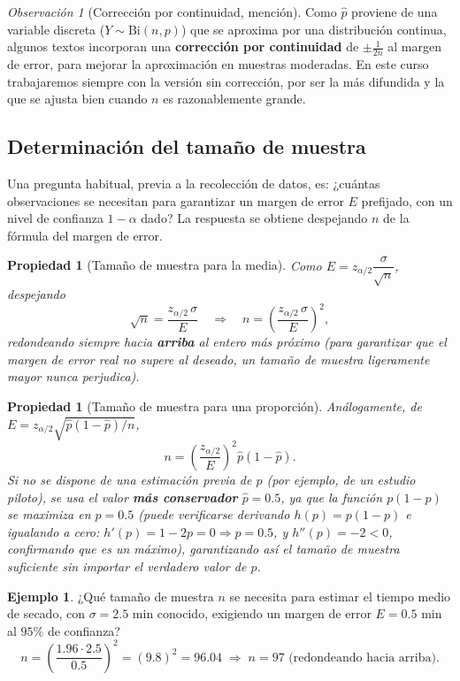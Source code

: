 \documentclass[11pt,a4paper]{article}
\theoremstyle{plain}
\newtheorem{propiedad}[teorema]{Propiedad}
\theoremstyle{definition}
\newtheorem{ejemplo}[teorema]{Ejemplo}
\theoremstyle{remark}
\newtheorem{observacion}[teorema]{Observación}
\begin{document}
\begin{observacion}[Corrección por continuidad, mención]
Como $\widehat p$ proviene de una variable discreta ($Y\sim\text{Bi}(n,p)$) que se aproxima por una distribución continua, algunos textos incorporan una \textbf{corrección por continuidad} de $\pm \frac{1}{2n}$ al margen de error, para mejorar la aproximación en muestras moderadas. En este curso trabajaremos siempre con la versión sin corrección, por ser la más difundida y la que se ajusta bien cuando $n$ es razonablemente grande.
\end{observacion}

\subsection{Determinación del tamaño de muestra}

Una pregunta habitual, previa a la recolección de datos, es: ¿cuántas observaciones se necesitan para garantizar un margen de error $E$ prefijado, con un nivel de confianza $1-\alpha$ dado? La respuesta se obtiene despejando $n$ de la fórmula del margen de error.

\begin{propiedad}[Tamaño de muestra para la media]
Como $E=z_{\alpha/2}\dfrac{\sigma}{\sqrt n}$, despejando
\[
\sqrt n = \frac{z_{\alpha/2}\,\sigma}{E} \quad\Longrightarrow\quad n = \left(\frac{z_{\alpha/2}\,\sigma}{E}\right)^2,
\]
redondeando siempre hacia \textbf{arriba} al entero más próximo (para garantizar que el margen de error real no supere al deseado, un tamaño de muestra ligeramente mayor nunca perjudica).
\end{propiedad}

\begin{propiedad}[Tamaño de muestra para una proporción]
Análogamente, de $E=z_{\alpha/2}\sqrt{\widehat p(1-\widehat p)/n}$,
\[
n = \left(\frac{z_{\alpha/2}}{E}\right)^2 \widehat p(1-\widehat p).
\]
Si no se dispone de una estimación previa de $p$ (por ejemplo, de un estudio piloto), se usa el valor \textbf{más conservador} $\widehat p=0.5$, ya que la función $p(1-p)$ se maximiza en $p=0.5$ (puede verificarse derivando $h(p)=p(1-p)$ e igualando a cero: $h'(p)=1-2p=0 \Rightarrow p=0.5$, y $h''(p)=-2<0$, confirmando que es un máximo), garantizando así el tamaño de muestra suficiente sin importar el verdadero valor de $p$.
\end{propiedad}

\begin{ejemplo}
¿Qué tamaño de muestra $n$ se necesita para estimar el tiempo medio de secado, con $\sigma=2.5$ min conocido, exigiendo un margen de error $E=0.5$ min al $95\%$ de confianza?
\[
n = \left(\frac{1.96\cdot 2.5}{0.5}\right)^2 = (9.8)^2 = 96.04 \;\Longrightarrow\; n=97 \text{ (redondeando hacia arriba).}
\]
\end{ejemplo}
\end{document}
